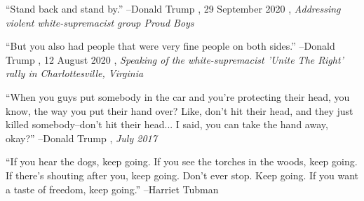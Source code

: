 \documentclass{article}%
\begin{document}
\linebreak%
\vspace{1mm}%
\begin{minipage}{\textwidth}%
\flushleft%
“Stand back and stand by.”%
\linebreak%
\vspace{1mm}%
–Donald Trump%
, 29 September 2020%
, \textit{Addressing violent white-supremacist group Proud Boys}%
\linebreak%
\vspace{1mm}%
\end{minipage}%
\linebreak%
\vspace{1mm}%
\begin{minipage}{\textwidth}%
\flushleft%
“But you also had people that were very fine people on both sides.”%
\linebreak%
\vspace{1mm}%
–Donald Trump%
, 12 August 2020%
, \textit{Speaking of the white-supremacist 'Unite The Right' rally in Charlottesville, Virginia}%
\linebreak%
\vspace{1mm}%
\end{minipage}%
\linebreak%
\vspace{1mm}%
\begin{minipage}{\textwidth}%
\flushleft%
“When you guys put somebody in the car and you're protecting their head, you know, the way you put their hand over? Like, don't hit their head, and they just killed somebody–don't hit their head... I said, you can take the hand away, okay?”%
\linebreak%
\vspace{1mm}%
–Donald Trump%
, \textit{July 2017}%
\linebreak%
\vspace{1mm}%
\end{minipage}%
\linebreak%
\vspace{1mm}%
\begin{minipage}{\textwidth}%
\flushleft%
“If you hear the dogs, keep going. If you see the torches in the woods, keep going. If there's shouting after you, keep going. Don't ever stop. Keep going. If you want a taste of freedom, keep going.”%
\linebreak%
\vspace{1mm}%
–Harriet Tubman%
\linebreak%
\vspace{1mm}%
\end{minipage}%
\end{document}
